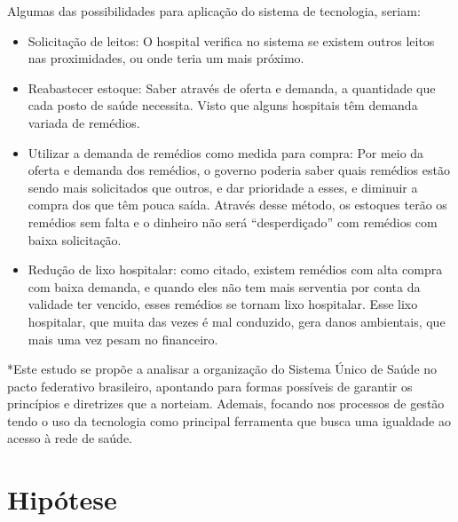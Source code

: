 \documentclass[twoside]{article}
\begin{document}
\begin{multicols}{2}
  Algumas das possibilidades para aplicação do sistema de tecnologia, seriam:
  \begin{itemize}
    \item Solicitação de leitos: O hospital verifica no sistema se existem outros leitos nas proximidades, ou onde teria um mais próximo.
    \item Reabastecer estoque: Saber através de oferta e demanda, a quantidade que cada posto de saúde necessita. Visto que alguns hospitais têm demanda variada de remédios.
    \item Utilizar a demanda de remédios como medida para compra: Por meio da oferta e demanda dos remédios, o governo poderia saber quais remédios estão sendo mais solicitados que outros, e dar prioridade a esses, e diminuir a compra dos que têm pouca saída. Através desse método, os estoques terão os remédios sem falta e o dinheiro não será “desperdiçado” com remédios com baixa solicitação.
    \item Redução de lixo hospitalar: como citado, existem remédios com alta compra com baixa demanda, e quando eles não tem mais serventia por conta da validade ter vencido, esses remédios se tornam lixo hospitalar. Esse lixo hospitalar, que muita das vezes é mal conduzido, gera danos ambientais, que mais uma vez pesam no financeiro.
  \end{itemize}
  \begin{footnotesize}
    *Este estudo se propõe a analisar a organização do Sistema Único de Saúde no pacto federativo brasileiro, apontando para
    formas possíveis de garantir os princípios e diretrizes que a norteiam. Ademais, focando nos processos de gestão tendo o uso da tecnologia como principal ferramenta que busca uma igualdade ao acesso à rede de saúde.
  \end{footnotesize}

  \iffalse
    \section{Hipótese}





\end{multicols}
\end{document}
